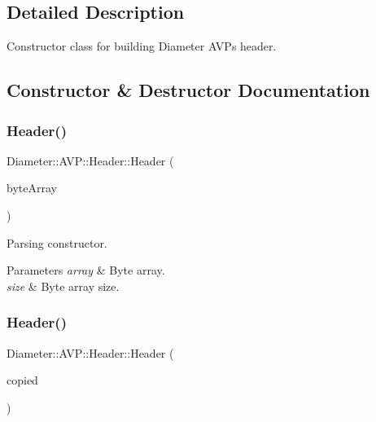 \subsection{Detailed Description}
Constructor class for building Diameter A\+V\+Ps header. 

\subsection{Constructor \& Destructor Documentation}
\mbox{\label{classDiameter_1_1AVP_1_1Header_ac08a910e8453759d348294223bc35e2f}} 
\subsubsection{\texorpdfstring{Header()}{Header()}\hspace{0.1cm}{\footnotesize\ttfamily [1/2]}}
{\footnotesize\ttfamily Diameter\+::\+A\+V\+P\+::\+Header\+::\+Header (\begin{DoxyParamCaption}\item[{const Byte\+Array \&}]{byte\+Array }\end{DoxyParamCaption})\hspace{0.3cm}{\ttfamily [explicit]}}



Parsing constructor. 


\begin{DoxyParams}{Parameters}
{\em array} & Byte array. \\
\hline
{\em size} & Byte array size. \\
\hline
\end{DoxyParams}
\mbox{\label{classDiameter_1_1AVP_1_1Header_ae37e5cbd056bb99cb583f5ec7e4285d6}} 
\subsubsection{\texorpdfstring{Header()}{Header()}\hspace{0.1cm}{\footnotesize\ttfamily [2/2]}}
{\footnotesize\ttfamily Diameter\+::\+A\+V\+P\+::\+Header\+::\+Header (\begin{DoxyParamCaption}\item[{const \hyperlink{classDiameter_1_1AVP_1_1Header}{Header} \&}]{copied }\end{DoxyParamCaption})\hspace{0.3cm}{\ttfamily [default]}}



